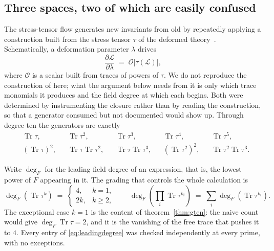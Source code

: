 \documentclass[11pt,a4paper]{article}
\theoremstyle{definition}
\theoremstyle{remark}
\begin{document}
\subsection{Three spaces, two of which are easily confused}
The stress-tensor flow generates new invariants from old by repeatedly applying
a construction built from the stress tensor $\tau$ of the deformed
theory~\cite{Hutomo:2025chiral,Ferko:2024chiral}. Schematically, a deformation
parameter $\lambda$ drives
\begin{equation}
\frac{\partial \mathcal{L}}{\partial \lambda}
 \;=\; \mathcal{O}\bigl[\tau(\mathcal{L})\bigr],
\label{eq:flow}
\end{equation}
where $\mathcal{O}$ is a scalar built from traces of powers of $\tau$. We do not
reproduce the construction of \cite{Hutomo:2025chiral} here; what the argument
below needs from it is only which trace monomials it produces and the field
degree at which each begins. Both were determined by instrumenting the closure
rather than by reading the construction, so that a generator consumed but not
documented would show up. Through degree ten the generators are exactly
\begin{equation}
\begin{aligned}
&\operatorname{Tr}\tau, &&
\operatorname{Tr}\tau^{2}, &&
\operatorname{Tr}\tau^{3}, &&
\operatorname{Tr}\tau^{4}, &&
\operatorname{Tr}\tau^{5}, \\
&(\operatorname{Tr}\tau)^{2}, &&
\operatorname{Tr}\tau\operatorname{Tr}\tau^{2}, &&
\operatorname{Tr}\tau\operatorname{Tr}\tau^{3}, &&
(\operatorname{Tr}\tau^{2})^{2}, &&
\operatorname{Tr}\tau^{2}\operatorname{Tr}\tau^{3}.
\end{aligned}
\label{eq:generators}
\end{equation}

Write $\deg_F$ for the leading field degree of an expression, that is, the lowest
power of $F$ appearing in it. The grading that controls the whole calculation is
\begin{equation}
\deg_F\!\left(\operatorname{Tr}\tau^{k}\right)
 \;=\;
 \begin{cases}
   4, & k = 1,\\[2pt]
   2k, & k \ge 2,
 \end{cases}
\qquad
\deg_F\!\left(\prod_i \operatorname{Tr}\tau^{k_i}\right)
 \;=\; \sum_i \deg_F\!\left(\operatorname{Tr}\tau^{k_i}\right).
\label{eq:leadingdegree}
\end{equation}
The exceptional case $k = 1$ is the content of theorem~\ref{thm:gten}: the naive
count would give $\deg_F\operatorname{Tr}\tau = 2$, and it is the vanishing of
the free trace that pushes it to $4$. Every entry of \eqref{eq:leadingdegree}
was checked independently at every prime, with no exceptions.
\end{document}
